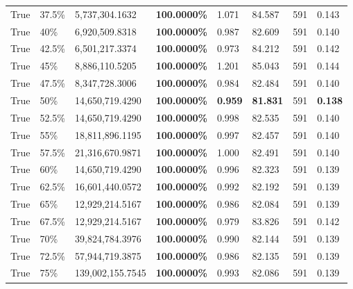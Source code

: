 \begin{table}[H]
\begin{tabular}{lllrllll}
\cline{1-8} \cline{2-8}
True & 37.5\% & 5,737,304.1632 & \bfseries \color{red} 100.0000\% & 1.071 & 84.587 & 591 & 0.143 \\
\cline{1-8} \cline{2-8}
True & 40\% & 6,920,509.8318 & \bfseries \color{red} 100.0000\% & 0.987 & 82.609 & 591 & 0.140 \\
\cline{1-8} \cline{2-8}
True & 42.5\% & 6,501,217.3374 & \bfseries \color{red} 100.0000\% & 0.973 & 84.212 & 591 & 0.142 \\
\cline{1-8} \cline{2-8}
True & 45\% & 8,886,110.5205 & \bfseries \color{red} 100.0000\% & 1.201 & 85.043 & 591 & 0.144 \\
\cline{1-8} \cline{2-8}
True & 47.5\% & 8,347,728.3006 & \bfseries \color{red} 100.0000\% & 0.984 & 82.484 & 591 & 0.140 \\
\cline{1-8} \cline{2-8}
True & 50\% & 14,650,719.4290 & \bfseries \color{red} 100.0000\% & \bfseries \color{red} 0.959 & \bfseries \color{red} 81.831 & 591 & \bfseries \color{red} 0.138 \\
\cline{1-8} \cline{2-8}
True & 52.5\% & 14,650,719.4290 & \bfseries \color{red} 100.0000\% & 0.998 & 82.535 & 591 & 0.140 \\
\cline{1-8} \cline{2-8}
True & 55\% & 18,811,896.1195 & \bfseries \color{red} 100.0000\% & 0.997 & 82.457 & 591 & 0.140 \\
\cline{1-8} \cline{2-8}
True & 57.5\% & 21,316,670.9871 & \bfseries \color{red} 100.0000\% & 1.000 & 82.491 & 591 & 0.140 \\
\cline{1-8} \cline{2-8}
True & 60\% & 14,650,719.4290 & \bfseries \color{red} 100.0000\% & 0.996 & 82.323 & 591 & 0.139 \\
\cline{1-8} \cline{2-8}
True & 62.5\% & 16,601,440.0572 & \bfseries \color{red} 100.0000\% & 0.992 & 82.192 & 591 & 0.139 \\
\cline{1-8} \cline{2-8}
True & 65\% & 12,929,214.5167 & \bfseries \color{red} 100.0000\% & 0.986 & 82.084 & 591 & 0.139 \\
\cline{1-8} \cline{2-8}
True & 67.5\% & 12,929,214.5167 & \bfseries \color{red} 100.0000\% & 0.979 & 83.826 & 591 & 0.142 \\
\cline{1-8} \cline{2-8}
True & 70\% & 39,824,784.3976 & \bfseries \color{red} 100.0000\% & 0.990 & 82.144 & 591 & 0.139 \\
\cline{1-8} \cline{2-8}
True & 72.5\% & 57,944,719.3875 & \bfseries \color{red} 100.0000\% & 0.986 & 82.135 & 591 & 0.139 \\
\cline{1-8} \cline{2-8}
True & 75\% & 139,002,155.7545 & \bfseries \color{red} 100.0000\% & 0.993 & 82.086 & 591 & 0.139 \\

\end{tabular}
\end{table}
